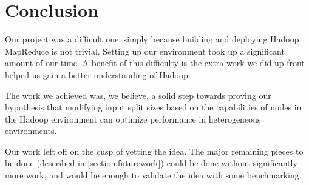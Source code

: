 \section{Conclusion}
\label{section:conclusion}
Our project was a difficult one, simply because building and deploying
Hadoop MapReduce is not trivial. Setting up our environment took up a
significant amount of our time. A benefit of this difficulty is the
extra work we did up front helped us gain a better understanding of
Hadoop.

The work we achieved was, we believe, a solid step towards proving our
hypothesis that modifying input split sizes based on the capabilities
of nodes in the Hadoop environment can optimize performance in heterogeneous
environments.

Our work left off on the cusp of vetting the idea. The major remaining
pieces to be done (described in \ref{section:futurework}) could be done without
significantly more work, and would be enough to validate the idea with
some benchmarking.